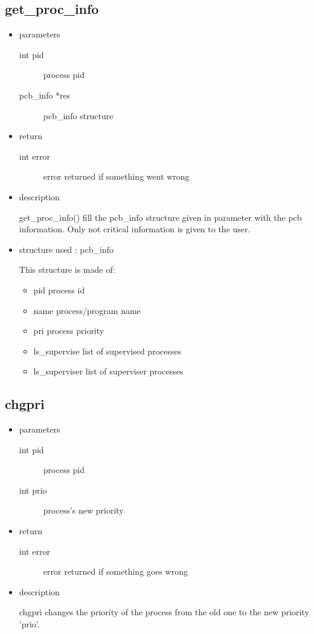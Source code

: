 \subsection{get\_proc\_info}
\begin{itemize}
\item{parameters}
\begin{description}
	\item[int pid] process pid
	\item[pcb\_info *res] pcb\_info structure
\end{description}
\item{return}
\begin{description}
	\item[int error] error returned if something went wrong 
\end{description}
\item{description}

get\_proc\_info() fill the pcb\_info structure given in parameter with the pcb information.
Only not critical information is given to the user.
\item{structure used : pcb\_info}

This structure is made of:
\begin{itemize}
	\item{pid} process id
	\item{name} process/program name
	\item{pri} process priority
	\item{ls\_supervise} list of supervised processes
	\item{ls\_superviser} list of superviser processes
\end{itemize}
\end{itemize}

\subsection{chgpri}
\begin{itemize}
\item{parameters}
\begin{description}
	\item[int pid] process pid
	\item[int prio] process's new priority
\end{description}
\item{return}
\begin{description}
	\item[int error] error returned if something goes wrong
\end{description}
\item{description}

chgpri changes the priority of the process from the old one to the new priority 'prio'.
\end{itemize}

